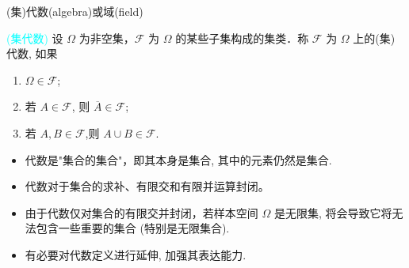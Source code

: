 \documentclass[Prob-All.tex]{subfiles}
\begin{document}
\begin{frame}{(集)代数(algebra)或域(field)}
\begin{defi}\textcolor{cyan}{(集代数)}
  设 $\Omega$ 为非空集，$\mathcal{F}$ 为 $\Omega$ 的某些子集构成的集类．称 $\mathcal{F}$ 为 $\Omega$ 上的(集)代数, 如果
\begin{enumerate}[<+-|alert@+>][(1)]
\item $\Omega \in \mathcal{F}$;
\item 若 $A \in \mathcal{F}$, 则 $\overline{A}\in \mathcal{F}$;
\item 若 $A, B \in \mathcal{F}$,则 $A \cup B \in \mathcal{F}$.
\end{enumerate}
\end{defi}
\pause

\begin{rmk}
	\begin{itemize}[<+-|alert@+>]
		\item 代数是"集合的集合"，即其本身是集合, 其中的元素仍然是集合. %
		\item 代数对于集合的求补、有限交和有限并运算封闭。
		\item 由于代数仅对集合的有限交并封闭，若样本空间 ${\Omega}$ 是无限集, 将会导致它将无法包含一些重要的集合 (特别是无限集合).
		\item 有必要对代数定义进行延伸, 加强其表达能力.
	\end{itemize}


\end{rmk}


\end{frame}
\end{document}
